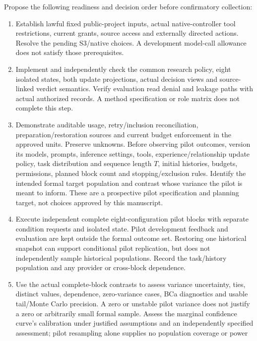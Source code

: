 \documentclass[
  english,
  11pt,
]{article}
\providecommand{\tightlist}{%
  \setlength{\itemsep}{0pt}\setlength{\parskip}{0pt}}
\begin{document}
Propose the following readiness and decision order before confirmatory
collection:

\begin{enumerate}
\def\labelenumi{\arabic{enumi}.}
\tightlist
\item
  Establish lawful fixed public-project inputs, actual native-controller
  tool restrictions, current grants, source access and externally
  directed actions. Resolve the pending S3/native choices. A development
  model-call allowance does not satisfy those prerequisites.
\item
  Implement and independently check the common research policy, eight
  isolated states, both update projections, actual decision views and
  source-linked verdict semantics. Verify evaluation read denial and
  leakage paths with actual authorized records. A method specification
  or role matrix does not complete this step.
\item
  Demonstrate auditable usage, retry/inclusion reconciliation,
  preparation/restoration sources and current budget enforcement in the
  approved units. Preserve unknowns. Before observing pilot outcomes,
  version its models, prompts, inference settings, tools,
  experience/relationship update policy, task distribution and sequence
  length \(T\), initial histories, budgets, permissions, planned block
  count and stopping/exclusion rules. Identify the intended formal
  target population and contrast whose variance the pilot is meant to
  inform. These are a prospective pilot specification and planning
  target, not choices approved by this manuscript.
\item
  Execute independent complete eight-configuration pilot blocks with
  separate condition requests and isolated state. Pilot development
  feedback and evaluation are kept outside the formal outcome set.
  Restoring one historical snapshot can support conditional pilot
  replication, but does not independently sample historical populations.
  Record the task/history population and any provider or cross-block
  dependence.
\item
  Use the actual complete-block contrasts to assess variance
  uncertainty, ties, distinct values, dependence, zero-variance cases,
  BCa diagnostics and usable tail/Monte Carlo precision. A zero or
  unstable pilot variance does not justify a zero or arbitrarily small
  formal sample. Assess the marginal confidence curve's calibration
  under justified assumptions and an independently specified assessment;
  pilot resampling alone supplies no population coverage or power

\end{enumerate}
\end{document}
